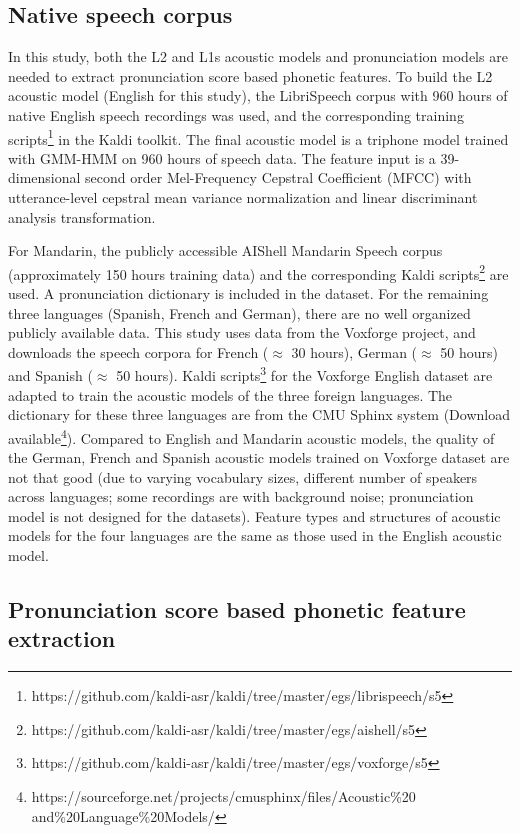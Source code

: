 \subsection{Native speech corpus}
In this study, both the L2 and L1s acoustic models and pronunciation models are needed to extract pronunciation score based phonetic features. To build the L2 acoustic model (English for this study), the LibriSpeech corpus \citep{panayotov2015librispeech} with 960 hours of native English speech recordings was used, and the corresponding training scripts\footnote{https://github.com/kaldi-asr/kaldi/tree/master/egs/librispeech/s5} in the Kaldi toolkit. The final acoustic model is a triphone model trained with GMM-HMM on 960 hours of speech data. The feature input is a 39-dimensional second order Mel-Frequency Cepstral Coefficient (MFCC) with utterance-level cepstral mean variance normalization and linear discriminant analysis transformation.

For Mandarin, the publicly accessible AIShell Mandarin Speech corpus (approximately 150 hours training data) \citep{bu2017aishell} and the corresponding Kaldi scripts\footnote{https://github.com/kaldi-asr/kaldi/tree/master/egs/aishell/s5} are used. A pronunciation dictionary is included in the dataset. For the remaining three languages (Spanish, French and German), there are no well organized publicly available data. This study uses data from the Voxforge project, and downloads the speech corpora for French ($\approx$ 30 hours), German ($\approx$ 50 hours) and Spanish ($\approx$ 50 hours). Kaldi scripts\footnote{https://github.com/kaldi-asr/kaldi/tree/master/egs/voxforge/s5} for the Voxforge English dataset are adapted to train the acoustic models of the three foreign languages. The dictionary for these three languages are from the CMU Sphinx system (Download available\footnote{https://sourceforge.net/projects/cmusphinx/files/Acoustic\%20 \\ \hspace*{4mm} and\%20Language\%20Models/}). Compared to English and Mandarin acoustic models, the quality of the German, French and Spanish acoustic models trained on Voxforge dataset are not that good (due to varying vocabulary sizes, different number of speakers across languages; some recordings are with background noise; pronunciation model is not designed for the datasets). Feature types and structures of acoustic models for the four languages are the same as those used in the English acoustic model.

\subsection{Pronunciation score based phonetic feature extraction}
\label{sec:segmental}

